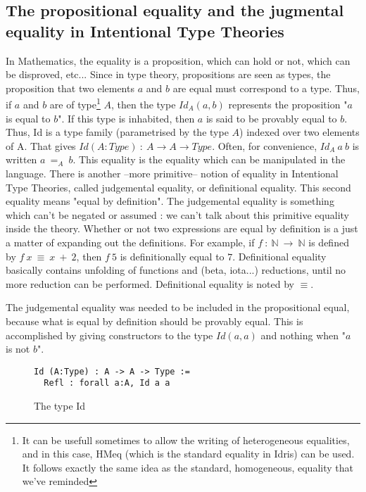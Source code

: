 \subsection{The propositional equality and the jugmental equality in Intentional Type Theories}
In Mathematics, the equality is a proposition, which can hold or not, which can be disproved, etc...
Since in type theory, propositions are seen as types, the proposition that two elements $a$ and $b$ are equal must correspond to a type. Thus, if $a$ and $b$ are of type\footnote{It can be usefull sometimes to allow the writing of heterogeneous equalities, and in this case, HMeq (which is the standard equality in Idris) can be used. It follows exactly the same idea as the standard, homogeneous, equality that we've reminded} $A$, then the type $Id_A(a, b)$ represents the proposition "$a$ is equal to $b$". If this type is inhabited, then $a$ is said to be provably equal to $b$.
Thus, Id is a type family (parametrised by the type $A$) indexed over two elements of A. That gives $Id (A:Type)\ :\ A \rightarrow A \rightarrow Type$. Often, for convenience, $Id_A\ a\ b$ is written $a\ =_A\ b$.
This equality is the equality which can be manipulated in the language. There is another --more primitive-- notion of equality in Intentional Type Theories, called judgemental equality, or definitional equality. This second equality means "equal by definition". The judgemental equality is something which can't be negated or assumed : we can't talk about this primitive equality inside the theory. Whether or not two expressions are equal by definition is a just a matter of expanding out the definitions. For example, if $f\ :\ \mathbb{N}\ \rightarrow\ \mathbb{N}$ is defined by $f\ x\ \equiv\ x\ +\ 2$, then $f\ 5$ is definitionally equal to $7$. Definitional equality basically contains unfolding of functions and (beta, iota...) reductions, until no more reduction can be performed.
Definitional equality is noted by $\equiv$.

The judgemental equality was needed to be included in the propositional equal, because what is equal by definition should be provably equal.
This is accomplished by giving constructors to the type $Id(a,a)$ and nothing when "$a$ is not $b$".
\begin{figure}[H]
\figrule
\begin{center}
\begin{verbatim}
Id (A:Type) : A -> A -> Type :=
  Refl : forall a:A, Id a a
\end{verbatim}
\end{center}
\caption{The type Id}
\figrule
\end{figure}

